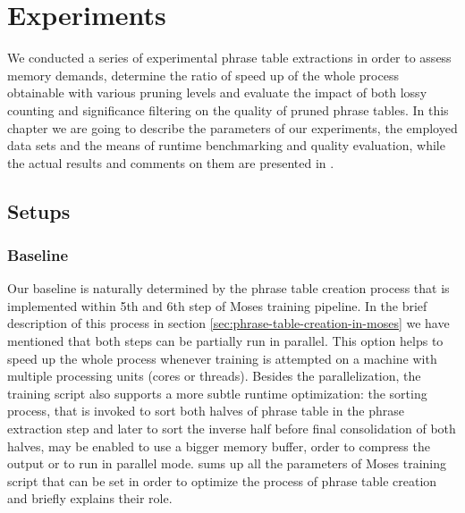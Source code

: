 \chapter{Experiments}
\label{chap:experiments}

We conducted a series of experimental phrase table extractions in order to
assess \eppex{} memory demands, determine the ratio of speed up of the whole
process obtainable with various pruning levels and evaluate the impact of both
lossy counting and significance filtering on the quality of pruned phrase tables.
In this chapter we are going to describe the parameters of our experiments,
the employed data sets and the means of runtime benchmarking and quality
evaluation, while the actual results and comments on them are presented in
.

\section{Setups}

\subsection{Baseline}

Our baseline is naturally determined by the phrase table creation process
that is implemented within 5th and 6th step of Moses training pipeline.
In the brief description of this process in section \ref{sec:phrase-table-creation-in-moses}
we have mentioned that both steps can be partially run in parallel.
This option helps to speed up the whole process whenever training is
attempted on a machine with multiple processing units (cores or threads).
Besides the parallelization, the training script also supports a more subtle
runtime optimization: the sorting process, that is invoked to sort both halves
of phrase table in the phrase extraction step and later to sort the inverse
half before final consolidation of both halves, may be enabled to use a bigger
memory buffer, order to compress the output or to run in parallel mode.
 sums up all the parameters of Moses
training script that can be set in order to optimize the process of phrase
table creation and briefly explains their role.

